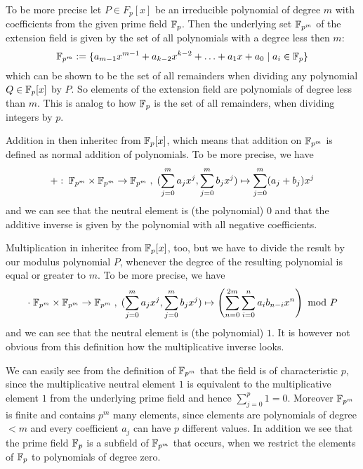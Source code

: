 To be more precise let $P\in F_p[x]$ be an irreducible polynomial of degree $m$ with coefficients from the given prime field $\mathbb{F}_p$. Then the underlying set $\mathbb{F}_{p^m}$ of the extension field is given by the set of all polynomials with a degree less then $m$:
\begin{equation}
\mathbb{F}_{p^m}:=\{a_{m-1} x^{m-1}+a_{k-2}x^{k-2}+\ldots+a_1 x+a_0\;|\; a_i\in \mathbb{F}_p\}
\end{equation}
which can be shown to be the set of all remainders when dividing any polynomial $Q\in \mathbb{F}_p[x]$ by $P$. So elements of the extension field are polynomials of degree less than $m$. This is analog to how $\mathbb{F}_p$ is the set of all remainders, when dividing integers by $p$.

Addition in then inheritec from $\mathbb{F}_p[x]$, which means that addition on $\mathbb{F}_{p^m}$ is defined as normal addition of polynomials. To be more precise, we have
\begin{equation}
+:\; \mathbb{F}_{p^m}\times \mathbb{F}_{p^m} \to \mathbb{F}_{p^m}\; ,\; (\sum_{j=0}^m a_j x^j,\sum_{j=0}^m b_j x^j)\mapsto \sum_{j=0}^m (a_j+b_j) x^j
\end{equation}
and we can see that the neutral element is (the polynomial) $0$ and that the additive inverse is given by the polynomial with all negative coefficients.

Multiplication in inheritec from $\mathbb{F}_p[x]$, too, but we have to divide the result by our modulus polynomial $P$, whenever the degree of the resulting polynomial is equal or greater to $m$. To be more precise, we have
\begin{equation}
\cdot\; \mathbb{F}_{p^m}\times \mathbb{F}_{p^m} \to \mathbb{F}_{p^m}\; ,\; (\sum_{j=0}^m a_j x^j,\sum_{j=0}^m b_j x^j)\mapsto \left(\sum _{n = 0} ^{2m} \sum _{i = 0} ^{n}{a} _{i }{{b} _{n-i}}{x} ^{n}\right) \text{ mod } P
\end{equation}
and we can see that the neutral element is (the polynomial) $1$. It is however not obvious from this definition how the multiplicative inverse looks.

We can easily see from the definition of $\mathbb{F}_{p^m}$ that the field is of characteristic $p$, since the multiplicative neutral element $1$ is equivalent to the multiplicative element $1$ from the underlying prime field and hence $\sum_{j=0}^p 1=0$. Moreover $\mathbb{F}_{p^m}$ is finite and contains $p^m$ many elements, since elements are polynomials of degree $<m$ and every coefficient $a_j$ can have $p$ different values. In addition we see that the prime field $\mathbb{F}_p$ is a subfield of $\mathbb{F}_{p^m}$ that occurs, when we restrict the elements of $\mathbb{F}_{p}$ to polynomials of degree zero.

